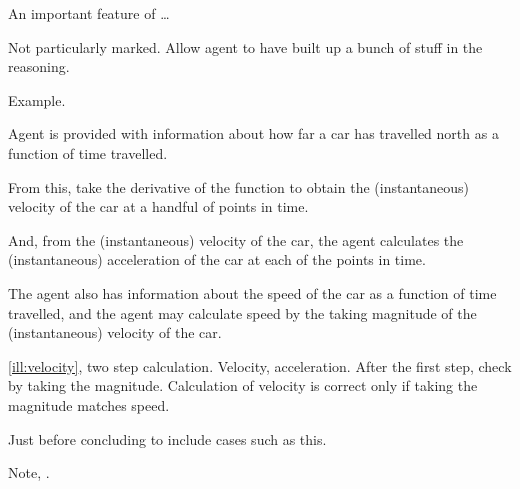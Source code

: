 \begin{note}
  An important feature of \qzS{} \dots

  Not particularly marked.
  Allow agent to have built up a bunch of stuff in the reasoning.

  Example.

  \begin{illustration}[Velocity]
    \label{ill:velocity}
    Agent is provided with information about how far a car has travelled north as a function of time travelled.

    From this, take the derivative of the function to obtain the (instantaneous) velocity of the car at a handful of points in time.

    And, from the (instantaneous) velocity of the car, the agent calculates the (instantaneous) acceleration of the car at each of the points in time.

    The agent also has information about the speed of the car as a function of time travelled, and the agent may calculate speed by the taking magnitude of the (instantaneous) velocity of the car.
  \end{illustration}

  \autoref{ill:velocity}, two step calculation.
  Velocity, acceleration.
  After the first step, check by taking the magnitude.
  Calculation of velocity is correct only if taking the magnitude matches speed.

  Just before concluding to include cases such as this.

  Note, \cScen{}.
\end{note}

